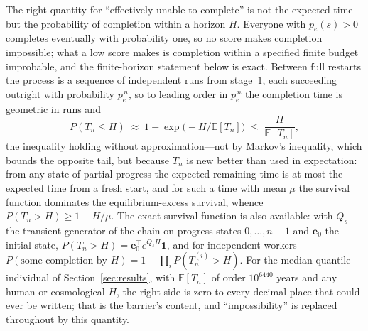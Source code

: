 \documentclass{article}
\begin{document}
The right quantity for ``effectively unable to complete'' is not the expected time but the probability of completion within a horizon $H$. Everyone with $p_e(s) > 0$ completes eventually with probability one, so no score makes completion impossible; what a low score makes is completion within a specified finite budget improbable, and the finite-horizon statement below is exact. Between full restarts the process is a sequence of independent runs from stage~$1$, each succeeding outright with probability $p_e^{\,n}$, so to leading order in $p_e^{\,n}$ the completion time is geometric in runs and
\begin{equation}\label{eq:horizon}
P(T_n \le H) \;\approx\; 1 - \exp\!\big(-H/\mathbb{E}[T_n]\big) \;\le\; \frac{H}{\mathbb{E}[T_n]},
\end{equation}
the inequality holding without approximation---not by Markov's inequality, which bounds the opposite tail, but because $T_n$ is new better than used in expectation: from any state of partial progress the expected remaining time is at most the expected time from a fresh start, and for such a time with mean $\mu$ the survival function dominates the equilibrium-excess survival, whence $P(T_n > H) \geq 1 - H/\mu$. The exact survival function is also available: with $Q_s$ the transient generator of the chain on progress states $0, \ldots, n-1$ and $\mathbf{e}_0$ the initial state, $P(T_n > H) = \mathbf{e}_0^{\top} e^{Q_s H}\mathbf{1}$, and for independent workers $P(\text{some completion by } H) = 1 - \prod_i P(T^{(i)}_n > H)$. For the median-quantile individual of Section~\ref{sec:results}, with $\mathbb{E}[T_n]$ of order $10^{6440}$ years and any human or cosmological $H$, the right side is zero to every decimal place that could ever be written; that is the barrier's content, and ``impossibility'' is replaced throughout by this quantity.
\end{document}
